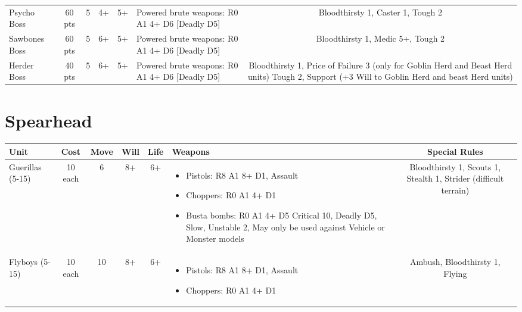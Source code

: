 \documentclass[landscape]{extarticle}
\begin{document}
\begin{small}
\begin{tabular}{UccccWS}
\\


Psycho Boss 
&
60 pts
&
5
&
4+
&
5+
&
Powered brute weapons: R0 A1 4+ D6 [Deadly D5]
&
Bloodthirsty 1, Caster 1, Tough 2


\\


Sawbones Boss 
&
60 pts
&
5
&
6+
&
5+
&
Powered brute weapons: R0 A1 4+ D6 [Deadly D5]
&
Bloodthirsty 1, Medic 5+, Tough 2


\\


Herder Boss 
&
40 pts
&
5
&
6+
&
5+
&
Powered brute weapons: R0 A1 4+ D6 [Deadly D5]
&
Bloodthirsty 1, Price of Failure 3 (only for Goblin Herd and Beast Herd units) Tough 2, Support (+3 Will to Goblin Herd and beast Herd units)
\end{tabular}








\section*{Spearhead}

\begin{tabular}{UccccWS}

\textbf{Unit} & \textbf{Cost} & \textbf{Move} & \textbf{Will} & \textbf{Life} & \textbf{Weapons} & \textbf{Special Rules} \\


\hline


Guerillas (5-15)
&
10 each
&
6
&
8+
&
6+
&
\begin{itemize}
    \item Pistols: R8 A1 8+ D1, Assault
    \item Choppers: R0 A1 4+ D1
\item Busta bombs: R0 A1 4+ D5 Critical 10, Deadly D5, Slow, Unstable 2, May only be used against Vehicle or Monster models
\end{itemize}
&
Bloodthirsty 1, Scouts 1, Stealth 1, Strider (difficult terrain)


\\


Flyboys (5-15)
&
10 each
&
10
&
8+
&
6+
&
\begin{itemize}
    \item Pistols: R8 A1 8+ D1, Assault
    \item Choppers: R0 A1 4+ D1
\end{itemize}
&
Ambush, Bloodthirsty 1, Flying



\end{tabular}
\end{small}
\end{document}
